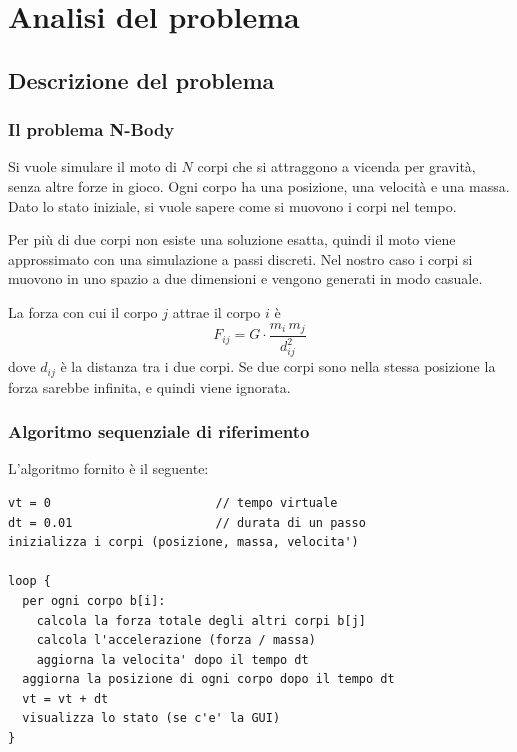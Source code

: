 \chapter{Analisi del problema}

%
%
\section{Descrizione del problema}

\subsection{Il problema N-Body}
Si vuole simulare il moto di $N$ corpi che si attraggono a vicenda per gravità, senza altre forze in gioco.
Ogni corpo ha una posizione, una velocità e una massa.
Dato lo stato iniziale, si vuole sapere come si muovono i corpi nel tempo.

Per più di due corpi non esiste una soluzione esatta, quindi il moto viene approssimato con una simulazione a passi discreti.
Nel nostro caso i corpi si muovono in uno spazio a due dimensioni e vengono generati in modo casuale.

La forza con cui il corpo $j$ attrae il corpo $i$ è
\[
  F_{ij} = G \cdot \frac{m_i \, m_j}{d_{ij}^2}
\]
dove $d_{ij}$ è la distanza tra i due corpi.
Se due corpi sono nella stessa posizione la forza sarebbe infinita, e quindi viene ignorata.

\subsection{Algoritmo sequenziale di riferimento}
L'algoritmo fornito è il seguente:
\begin{lstlisting}[basicstyle=\ttfamily\small]
vt = 0                       // tempo virtuale
dt = 0.01                    // durata di un passo
inizializza i corpi (posizione, massa, velocita')

loop {
  per ogni corpo b[i]:
    calcola la forza totale degli altri corpi b[j]
    calcola l'accelerazione (forza / massa)
    aggiorna la velocita' dopo il tempo dt
  aggiorna la posizione di ogni corpo dopo il tempo dt
  vt = vt + dt
  visualizza lo stato (se c'e' la GUI)
}
\end{lstlisting}

